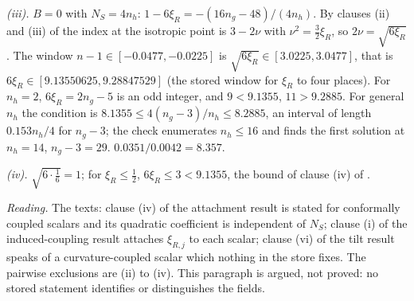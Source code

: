 \emph{(iii).} $B = 0$ with $N_{S} = 4n_{h}$: $1 - 6\xi_{R} = -(16n_{g} - 48)/(4n_{h})$. By clauses (ii) and (iii) of  the index at the isotropic point is $3 - 2\nu$ with $\nu^{2} = \tfrac32\xi_{R}$, so $2\nu = \sqrt{6\xi_{R}}$. The window $n - 1 \in [-0.0477, -0.0225]$ is $\sqrt{6\xi_{R}} \in [3.0225, 3.0477]$, that is $6\xi_{R} \in [9.13550625, 9.28847529]$ (the stored window for $\xi_{R}$ to four places). For $n_{h} = 2$, $6\xi_{R} = 2n_{g} - 5$ is an odd integer, and $9 < 9.1355$, $11 > 9.2885$. For general $n_{h}$ the condition is $8.1355 \le 4(n_{g} - 3)/n_{h} \le 8.2885$, an interval of length $0.153n_{h}/4$ for $n_{g} - 3$; the check enumerates $n_{h} \le 16$ and finds the first solution at $n_{h} = 14$, $n_{g} - 3 = 29$. $0.0351/0.0042 = 8.357$.

\emph{(iv).} $\sqrt{6\cdot\tfrac16} = 1$; for $\xi_{R} \le \tfrac12$, $6\xi_{R} \le 3 < 9.1355$, the bound of clause (iv) of .

\emph{Reading.} The texts: clause (iv) of the attachment result is stated for conformally coupled scalars and its quadratic coefficient is independent of $N_{S}$; clause (i) of the induced-coupling result attaches $\xi_{R,j}$ to each scalar; clause (vi) of the tilt result speaks of a curvature-coupled scalar which nothing in the store fixes. The pairwise exclusions are (ii) to (iv). This paragraph is argued, not proved: no stored statement identifies or distinguishes the fields.
